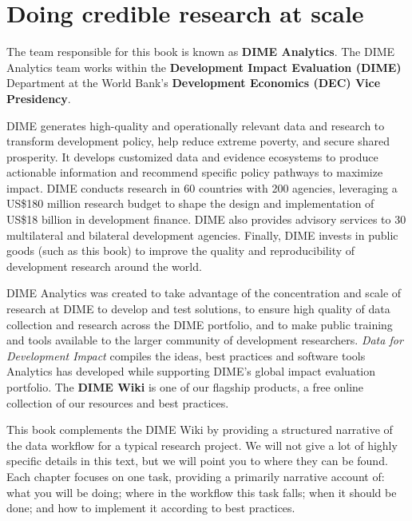 
\section{Doing credible research at scale}

The team responsible for this book is known as \textbf{DIME Analytics}.
The DIME Analytics team works within the \textbf{Development Impact Evaluation (DIME)} Department
at the World Bank's \textbf{Development Economics (DEC) Vice Presidency}.

DIME generates high-quality and operationally relevant data and research 
to transform development policy, help reduce extreme poverty, and secure shared prosperity. 
It develops customized data and evidence ecosystems to produce actionable information 
and recommend specific policy pathways to maximize impact.
DIME conducts research in 60 countries with 200 agencies, leveraging a 
US\$180 million research budget to shape the design and implementation of 
US\$18 billion in development finance. 
DIME also provides advisory services to 30 multilateral and bilateral development agencies. 
Finally, DIME invests in public goods (such as this book) to improve the quality and reproducibility of development research around the world. 

DIME Analytics was created to take advantage of the concentration and scale of research at DIME to develop and test solutions, 
to ensure high quality of data collection and research across the DIME portfolio, 
and to make public training and tools available to the larger community of development researchers.
\textit{Data for Development Impact} compiles the ideas, best practices and software tools Analytics 
has developed while supporting DIME's global impact evaluation portfolio. 
The \textbf{DIME Wiki} is one of our flagship products, a free online collection of our resources and best practices.

This book complements the DIME Wiki by providing a structured narrative of the data workflow for a typical research project. 
We will not give a lot of highly specific details in this text,
but we will point you to where they can be found.
Each chapter focuses on one task, providing a primarily narrative account of:
what you will be doing; where in the workflow this task falls;
when it should be done; and how to implement it according to best practices.



